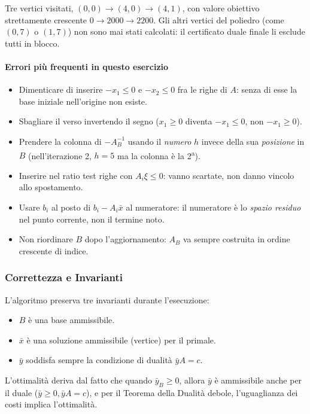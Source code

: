\documentclass[12pt]{extarticle} %
\begin{document}
\medskip
Tre vertici visitati, $(0,0) \to (4,0) \to (4,1)$, con valore obiettivo strettamente crescente $0 \to 2000 \to 2200$. Gli altri vertici del poliedro (come $(0,7)$ o $(1,7)$) non sono mai stati calcolati: il certificato duale finale li esclude tutti in blocco.

\paragraph{Errori più frequenti in questo esercizio}
\begin{itemize}
    \item Dimenticare di inserire $-x_1 \le 0$ e $-x_2 \le 0$ fra le righe di $A$: senza di esse la base iniziale nell'origine non esiste.
    \item Sbagliare il verso invertendo il segno ($x_1 \ge 0$ diventa $-x_1 \le 0$, non $-x_1 \ge 0$).
    \item Prendere la colonna di $-A_B^{-1}$ usando il \emph{numero} $h$ invece della sua \emph{posizione} in $B$ (nell'iterazione 2, $h=5$ ma la colonna è la 2\textsuperscript{a}).
    \item Inserire nel ratio test righe con $A_i\xi \le 0$: vanno scartate, non danno vincolo allo spostamento.
    \item Usare $b_i$ al posto di $b_i - A_i\bar{x}$ al numeratore: il numeratore è lo \emph{spazio residuo} nel punto corrente, non il termine noto.
    \item Non riordinare $B$ dopo l'aggiornamento: $A_B$ va sempre costruita in ordine crescente di indice.
\end{itemize}

\subsubsection{Correttezza e Invarianti}
L'algoritmo preserva tre invarianti durante l'esecuzione:
\begin{itemize}
    \item $B$ è una base ammissibile.
    \item $\bar{x}$ è una soluzione ammissibile (vertice) per il primale.
    \item $\bar{y}$ soddisfa sempre la condizione di dualità $\bar{y} A = c$.
\end{itemize}
L'ottimalità deriva dal fatto che quando $\bar{y}_B \ge 0$, allora $\bar{y}$ è ammissibile anche per il duale ($\bar{y} \ge 0, \bar{y} A = c$), e per il Teorema della Dualità debole, l'uguaglianza dei costi implica l'ottimalità.
\end{document}
